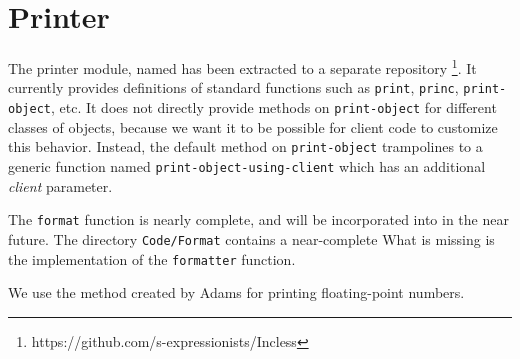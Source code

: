 \chapter{Printer}

The printer module, named \incless{} has been extracted to a separate
repository%
\footnote{https://github.com/s-expressionists/Incless}.
It currently provides definitions of standard functions such as
\texttt{print}, \texttt{princ}, \texttt{print-object}, etc.  It does
not directly provide methods on \texttt{print-object} for different
classes of objects, because we want it to be possible for client code
to customize this behavior.  Instead, the default method on
\texttt{print-object} trampolines to a generic function named
\texttt{print-object-using-client} which has an additional
\emph{client} parameter.

The \texttt{format} function is nearly complete, and will be
incorporated into \incless{} in the near future.  The directory
\texttt{Code/Format} contains a near-complete What is missing is the
implementation of the \texttt{formatter} function.

We use the method created by Adams
\cite{Adams:2018:RFF:3296979.3192369} for printing floating-point
numbers.

